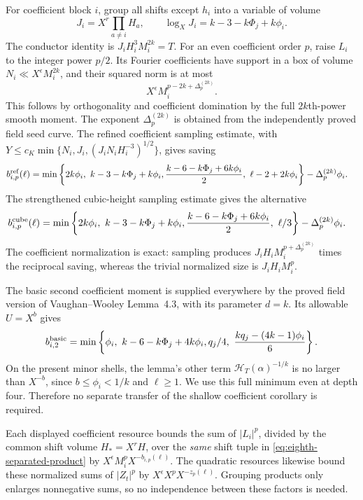 \documentclass[11pt,reqno]{amsart}
\numberwithin{equation}{section}
\theoremstyle{definition}
\begin{document}
For coefficient block $i$, group all shifts except $h_i$ into a variable
of volume
\[
 J_i=X^r\prod_{a\ne i}H_a,
 \qquad \log_X J_i=k-3-k\Phi_j+k\phi_i.
\]
The conductor identity is
$J_iH_i^3M_i^{2k}=T$.
For an even coefficient order $p$, raise $L_i$ to the integer power $p/2$.
Its Fourier coefficients have support in a box of volume
$N_i\ll X^\epsilon M_i^{2k}$, and their squared norm is at most
\[
 X^\epsilon M_i^{p-2k+\Delta_p^{(2k)}}.
\]
This follows by orthogonality and coefficient domination by the full
$2k$th-power smooth moment. The exponent $\Delta_p^{(2k)}$ is obtained
from the independently proved field seed curve. The refined coefficient
sampling estimate, with
$Y\le c_K\min\{N_i,J_i,(J_iN_iH_i^{-3})^{1/2}\}$, gives saving
\begin{align}
 b_{i,p}^{\rm ref}(\ell)
 &=\min\left\{2k\phi_i,\ k-3-k\Phi_j+k\phi_i,
       \frac{k-6-k\Phi_j+6k\phi_i}{2},\ \ell-2+2k\phi_i\right\}
       -\Delta_p^{(2k)}\phi_i.\label{eq:eighth-refined-resource}
\end{align}
The strengthened cubic-height sampling estimate gives the alternative
\begin{align}
 b_{i,p}^{\rm cube}(\ell)
 &=\min\left\{2k\phi_i,\ k-3-k\Phi_j+k\phi_i,
       \frac{k-6-k\Phi_j+6k\phi_i}{2},\ \ell/3\right\}
       -\Delta_p^{(2k)}\phi_i.\label{eq:eighth-cube-resource}
\end{align}
The coefficient normalization is exact: sampling produces
$J_iH_i M_i^{p+\Delta_p^{(2k)}}$ times the reciprocal saving, whereas the
trivial normalized size is $J_iH_iM_i^p$.

The basic second coefficient moment is supplied everywhere by the proved
field version of Vaughan--Wooley Lemma~4.3, with its parameter $d=k$.
Its allowable $U=X^b$ gives
\begin{equation}\label{eq:eighth-basic-resource}
 b_{i,2}^{\rm basic}=
 \min\left\{\phi_i,\ k-6-k\Phi_j+4k\phi_i,
               q_j/4,\ \frac{kq_j-(4k-1)\phi_i}{6}\right\}.
\end{equation}
On the present minor shells, the lemma's other term
$\mathcal H_T(\alpha)^{-1/k}$ is no larger than $X^{-b}$, since
$b\le\phi_i<1/k$ and $\ell\ge1$.
We use this full minimum even at depth four. Therefore no separate transfer
of the shallow coefficient corollary is required.

Each displayed coefficient resource bounds the sum of $|L_i|^p$, divided
by the common shift volume $H_*=X^rH$, over the \emph{same} shift tuple in \eqref{eq:eighth-separated-product}
by $X^\epsilon M_i^pX^{-b_{i,p}(\ell)}$.
The quadratic resources likewise bound these normalized sums of $|Z_t|^p$ by
$X^\epsilon X^pX^{-z_p(\ell)}$.
Grouping products only enlarges nonnegative sums, so no independence between
these factors is needed.
\end{document}

